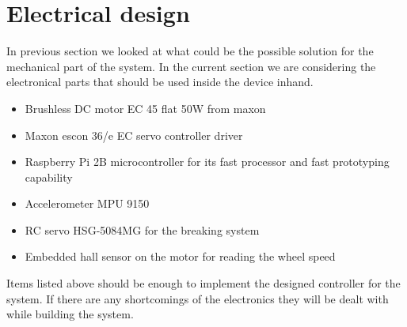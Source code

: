 \section{Electrical design}

In previous section we looked at what could be the possible solution for the mechanical part of the system.
In the current section we are considering the electronical parts that should be used inside the device inhand.

\begin{itemize}
 \item Brushless DC motor EC 45 flat 50W from maxon
 \item Maxon escon 36/e EC servo controller driver
 \item Raspberry Pi 2B microcontroller for its fast processor and fast prototyping capability
 \item Accelerometer MPU 9150
 \item RC servo HSG-5084MG for the breaking system
 \item Embedded hall sensor on the motor for reading the wheel speed
\end{itemize}

Items listed above should be enough to implement the designed controller for the system.
If there are any shortcomings of the electronics they will be dealt with while building the system.





